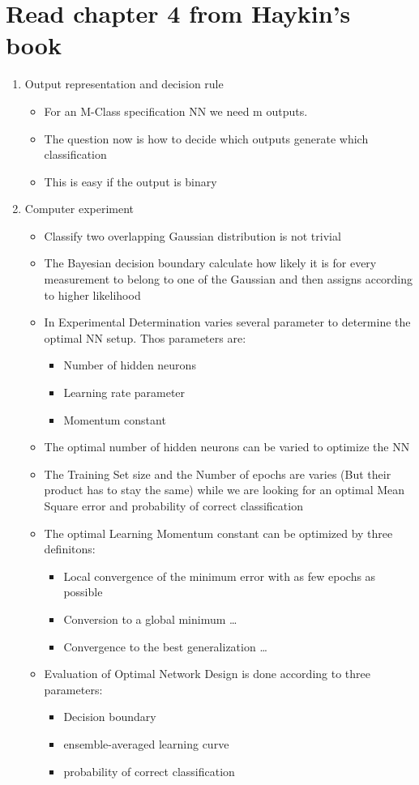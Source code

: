 \documentclass{scrartcl}
\begin{document}
\section{Read chapter 4 from Haykin's book
}
\begin{enumerate}
\addtocounter{enumi}{6}
\item Output representation and decision rule
	\begin{itemize}
	\item For an M-Class specification NN we need m outputs.
	\item The question now is how to decide which outputs generate which classification
	\item This is easy if the output is binary
	\end{itemize}

\item Computer experiment
	\begin{itemize}
	\item Classify two overlapping Gaussian distribution is not trivial
	\item The Bayesian decision boundary calculate how likely it is for every measurement to belong to one of the Gaussian and then assigns according to higher likelihood
	\item In Experimental Determination varies several parameter to determine the optimal NN setup. Thos parameters are:
		\begin{itemize}
		\item Number of hidden neurons
		\item Learning rate parameter
		\item Momentum constant
		\end{itemize}
	\item The optimal number of hidden neurons can be varied to optimize the NN
	\item The Training Set size and the Number of epochs are varies (But their product has to stay the same) while we are looking for an optimal Mean Square error and probability of correct classification
	\item The optimal Learning Momentum constant can be optimized by three definitons:
		\begin{itemize}
		\item Local convergence of the minimum error with as few epochs as possible
		\item Conversion to a global minimum \dots
		\item Convergence to the best generalization \dots
		\end{itemize}
	\item Evaluation of Optimal Network Design is done according to three parameters:
		\begin{itemize}
		\item Decision boundary
		\item ensemble-averaged learning curve
		\item probability of correct classification
		\end{itemize}
 	\end{itemize}
	

\end{enumerate}
\end{document}
